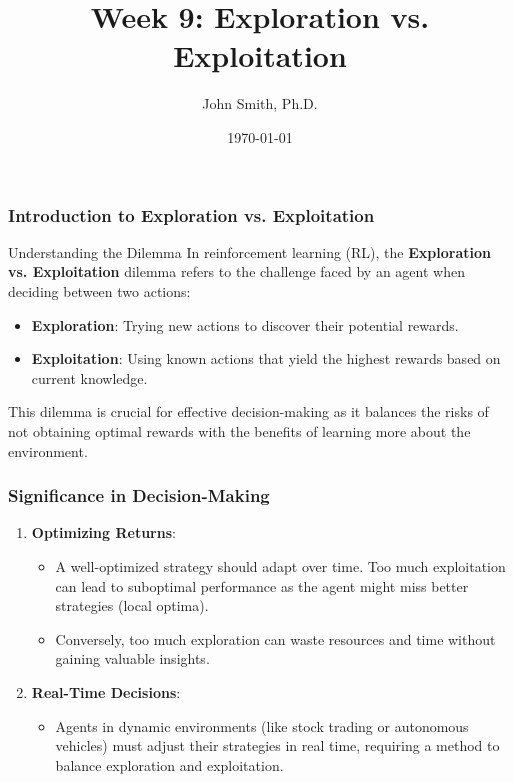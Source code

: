 \documentclass[aspectratio=169]{beamer}
\title[Exploration vs. Exploitation]{Week 9: Exploration vs. Exploitation}
\author[J. Smith]{John Smith, Ph.D.}
\institute[University Name]{
  Department of Computer Science\\
  University Name\\
  \vspace{0.3cm}
  Email: email@university.edu\\
  Website: www.university.edu
}
\date{\today}
\begin{document}
\frame{\titlepage}

\begin{frame}
    \titlepage
\end{frame}

\begin{frame}[fragile]
    \frametitle{Introduction to Exploration vs. Exploitation}
    \begin{block}{Understanding the Dilemma}
        In reinforcement learning (RL), the \textbf{Exploration vs. Exploitation} dilemma refers to the challenge faced by an agent when deciding between two actions:
    \end{block}
    \begin{itemize}
        \item \textbf{Exploration}: Trying new actions to discover their potential rewards.
        \item \textbf{Exploitation}: Using known actions that yield the highest rewards based on current knowledge.
    \end{itemize}
    This dilemma is crucial for effective decision-making as it balances the risks of not obtaining optimal rewards with the benefits of learning more about the environment.
\end{frame}

\begin{frame}[fragile]
    \frametitle{Significance in Decision-Making}

    \begin{enumerate}
        \item \textbf{Optimizing Returns}:
            \begin{itemize}
                \item A well-optimized strategy should adapt over time. Too much exploitation can lead to suboptimal performance as the agent might miss better strategies (local optima).
                \item Conversely, too much exploration can waste resources and time without gaining valuable insights.
            \end{itemize}
        
        \item \textbf{Real-Time Decisions}:
            \begin{itemize}
                \item Agents in dynamic environments (like stock trading or autonomous vehicles) must adjust their strategies in real time, requiring a method to balance exploration and exploitation.
            \end{itemize}
    \end{enumerate}
\end{frame}
\end{document}
